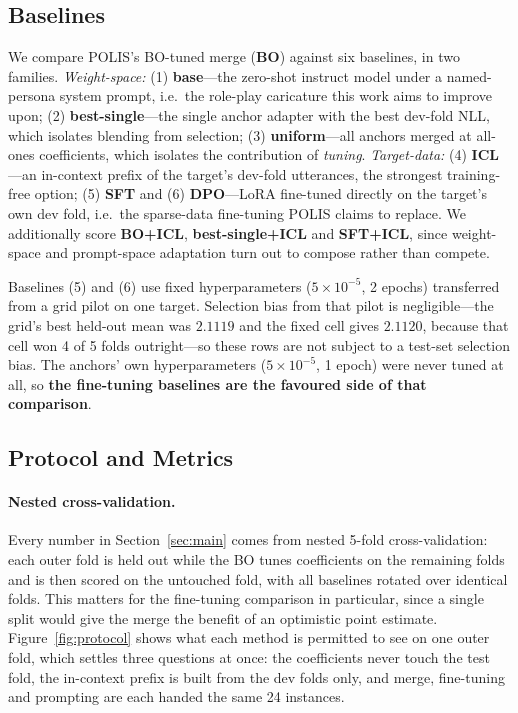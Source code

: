\documentclass[11pt,letterpaper]{article}
\begin{document}
\subsection{Baselines}
We compare POLIS's BO-tuned merge (\textbf{BO}) against six baselines, in two families. \emph{Weight-space:} (1) \textbf{base}---the zero-shot instruct model under a named-persona system prompt, i.e.\ the role-play caricature this work aims to improve upon; (2) \textbf{best-single}---the single anchor adapter with the best dev-fold NLL, which isolates blending from selection; (3) \textbf{uniform}---all anchors merged at all-ones coefficients, which isolates the contribution of \emph{tuning}. \emph{Target-data:} (4) \textbf{ICL}---an in-context prefix of the target's dev-fold utterances, the strongest training-free option; (5) \textbf{SFT} and (6) \textbf{DPO}---LoRA fine-tuned directly on the target's own dev fold, i.e.\ the sparse-data fine-tuning POLIS claims to replace. We additionally score \textbf{BO+ICL}, \textbf{best-single+ICL} and \textbf{SFT+ICL}, since weight-space and prompt-space adaptation turn out to compose rather than compete.

Baselines (5) and (6) use fixed hyperparameters ($5\times10^{-5}$, 2 epochs) transferred from a grid pilot on one target. Selection bias from that pilot is negligible---the grid's best held-out mean was $2.1119$ and the fixed cell gives $2.1120$, because that cell won 4 of 5 folds outright---so these rows are not subject to a test-set selection bias. The anchors' own hyperparameters ($5\times10^{-5}$, 1 epoch) were never tuned at all, so \textbf{the fine-tuning baselines are the favoured side of that comparison}.

\subsection{Protocol and Metrics}
\paragraph{Nested cross-validation.} Every number in Section~\ref{sec:main} comes from nested 5-fold cross-validation: each outer fold is held out while the BO tunes coefficients on the remaining folds and is then scored on the untouched fold, with all baselines rotated over identical folds. This matters for the fine-tuning comparison in particular, since a single split would give the merge the benefit of an optimistic point estimate. Figure~\ref{fig:protocol} shows what each method is permitted to see on one outer fold, which settles three questions at once: the coefficients never touch the test fold, the in-context prefix is built from the dev folds only, and merge, fine-tuning and prompting are each handed the same 24 instances.
\end{document}
